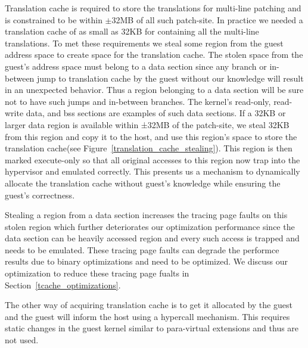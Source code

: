 Translation cache is required to store the translations for multi-line patching and is constrained to be within $\pm$32MB of all such patch-site. In practice we needed a translation cache of as small as 32KB for containing all the multi-line translations. To met these requirements we steal some region from the guest address space to create space for the translation cache. The stolen space from the guest's address space must belong to a data section since any branch or in-between jump to translation cache by the guest without our knowledge will result in an unexpected behavior. Thus a region belonging to a data section will be sure not to have such jumps and in-between branches. The kernel’s read-only, read-write data, and bss sections are examples of such data sections. If a 32KB or larger data region is available within ±32MB of the patch-site, we steal 32KB from this region and copy it to the host, and use this region’s space to store the translation cache(see Figure~\ref{translation_cache_stealing}). This region is then marked execute-only so that all original accesses to this region now trap into the hypervisor and emulated correctly. This presents us a mechanism to dynamically allocate the translation cache without guest's knowledge while ensuring the guest's correctness.

Stealing a region from a data section increases the tracing page faults on this stolen region which further deteriorates our optimization performance since the data section can be heavily accessed region and every such access is trapped and needs to be emulated. These tracing page faults can degrade the performce results due to binary optimizations and need to be optimized. We discuss our optimization to reduce these tracing page fualts in Section~\ref{tcache_optimizations}. 

The other way of acquiring translation cache is to get it allocated by the guest and the guest will inform the host using a hypercall mechanism. This requires static changes in the guest kernel similar to para-virtual extensions and thus are not used.





